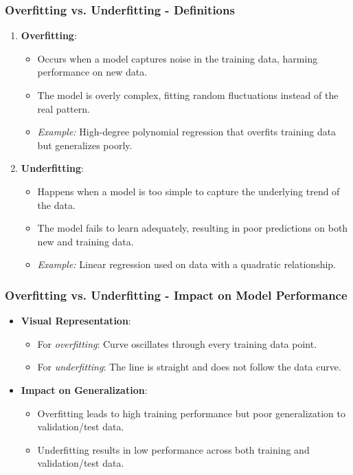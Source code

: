 \documentclass{beamer}
\begin{document}
\begin{frame}[fragile]
    \frametitle{Overfitting vs. Underfitting - Definitions}
    \begin{enumerate}
        \item \textbf{Overfitting}:
        \begin{itemize}
            \item Occurs when a model captures noise in the training data, harming performance on new data.
            \item The model is overly complex, fitting random fluctuations instead of the real pattern.
            \item \textit{Example:} High-degree polynomial regression that overfits training data but generalizes poorly.
        \end{itemize}

        \item \textbf{Underfitting}:
        \begin{itemize}
            \item Happens when a model is too simple to capture the underlying trend of the data.
            \item The model fails to learn adequately, resulting in poor predictions on both new and training data.
            \item \textit{Example:} Linear regression used on data with a quadratic relationship.
        \end{itemize}
    \end{enumerate}
\end{frame}

\begin{frame}[fragile]
    \frametitle{Overfitting vs. Underfitting - Impact on Model Performance}
    \begin{itemize}
        \item \textbf{Visual Representation}:
        \begin{itemize}
            \item For \textit{overfitting}: Curve oscillates through every training data point.
            \item For \textit{underfitting}: The line is straight and does not follow the data curve.
        \end{itemize}

        \item \textbf{Impact on Generalization}:
        \begin{itemize}
            \item Overfitting leads to high training performance but poor generalization to validation/test data.
            \item Underfitting results in low performance across both training and validation/test data.
        \end{itemize}
    \end{itemize}
\end{frame}
\end{document}
